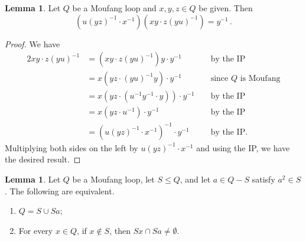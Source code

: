 \documentclass[12pt, twoside, openright]{report}
\theoremstyle{definition}
\newtheorem{lem}[thm]{Lemma}
\begin{document}
\begin{lem}\label{tech-coset-int}
  Let $Q$ be a Moufang loop and $x,y,z\in Q$ be given. Then
  \[
  (u(yz)^{-1}\cdot x^{-1})(xy\cdot z(yu)^{-1}) = y^{-1}\,.
  \]
  \end{lem}
  \begin{proof}
  We have 
  \begin{alignat*}{2}
  xy\cdot z(yu)^{-1}
      &= (xy\cdot z(yu)^{-1})y\cdot y^{-1}            && \text{ by the IP} \\
      &= x(yz\cdot (yu)^{-1}y)\cdot y^{-1}            && \text{ since }Q\text{ is Moufang} \\
      &= x(yz\cdot (u^{-1}y^{-1}\cdot y))\cdot y^{-1} && \text{ by the IP} \\
      &= x(yz\cdot u^{-1})\cdot y^{-1}                && \text{ by the IP} \\
      &= (u(yz)^{-1}\cdot x^{-1})^{-1}\cdot y^{-1}    && \text{ by the IP.}
  \end{alignat*}
  Multiplying both sides on the left by $u(yz)^{-1}\cdot x^{-1}$ and using the IP, we have the desired result.
\end{proof}

\begin{lem}\label{lem-q-part}
  Let $Q$ be a Moufang loop, let $S\leq Q$, and let $a\in Q- S$ satisfy $a^2\in S$. The following are equivalent.
  \begin{enumerate}
    \item $Q = S\cup Sa$;
    \item For every $x\in Q$, if $x\not\in S$, then $Sx\cap Sa\neq \emptyset$.
  \end{enumerate}
\end{lem}
\end{document}
